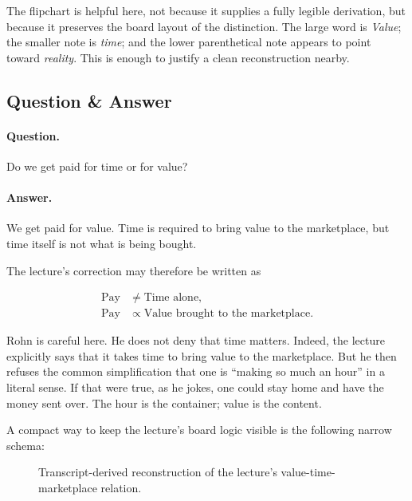 The flipchart is helpful here, not because it supplies a fully legible derivation, but because it preserves the board layout of the distinction. The large word is \emph{Value}; the smaller note is \emph{time}; and the lower parenthetical note appears to point toward \emph{reality}. This is enough to justify a clean reconstruction nearby.

\subsection{Question \& Answer}

\paragraph{Question.} Do we get paid for time or for value?

\paragraph{Answer.} We get paid for value. Time is required to bring value to the marketplace, but time itself is not what is being bought.

The lecture's correction may therefore be written as

\begin{align}
\text{Pay} &\neq \text{Time alone},\\
\text{Pay} &\propto \text{Value brought to the marketplace}.
\end{align}

Rohn is careful here. He does not deny that time matters. Indeed, the lecture explicitly says that it takes time to bring value to the marketplace. But he then refuses the common simplification that one is “making so much an hour” in a literal sense. If that were true, as he jokes, one could stay home and have the money sent over. The hour is the container; value is the content.

A compact way to keep the lecture's board logic visible is the following narrow schema:

\begin{figure}[h]
\centering
{}
\caption{Transcript-derived reconstruction of the lecture's value-time-marketplace relation.}
\end{figure}


